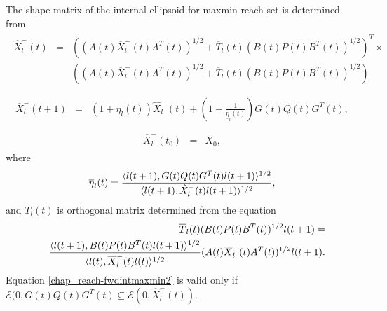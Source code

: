 \documentclass[letterpaper,10pt,english]{sphinxmanual}
\begin{document}
The shape matrix of the internal ellipsoid for maxmin reach set is
determined from
\label{chap_reach:equation-fwdintmaxmin1}\begin{gather}
\begin{split}\hat{X}^-_l(t) & = &
\left((A(t)\overline{X}^-_l(t)A^T(t))^{1/2} +
\overline{T}_l(t)(B(t)P(t)B^T(t))^{1/2}\right)^T
\times \nonumber \\
& &\left((A(t)\overline{X}^-_l(t)A^T(t))^{1/2} +
\overline{T}_l(t)(B(t)P(t)B^T(t))^{1/2}\right)\\\end{split}\label{chap_reach-fwdintmaxmin1}
\end{gather}\label{chap_reach:equation-fwdintmaxmin2}\begin{gather}
\begin{split}\overline{X}^-_l(t+1) & = &
(1+\overline{\eta}_l(t))\hat{X}^-_l(t) +
\left(1+\frac{1}{\underline{\eta}_l(t)}\right)
G(t)Q(t)G^T(t), \\\end{split}\label{chap_reach-fwdintmaxmin2}
\end{gather}\label{chap_reach:equation-fwdintmaxmin3}\begin{gather}
\begin{split}\overline{X}^-_l(t_0) & = & X_0,\end{split}\label{chap_reach-fwdintmaxmin3}
\end{gather}
where
\begin{gather}
\begin{split}\overline{\eta}_l(t) = \frac{\langle l(t+1),
G(t)Q(t)G^T(t)l(t+1)\rangle^{1/2}}{\langle l(t+1),
\hat{X}^-_l(t)l(t+1)\rangle^{1/2}},\end{split}\notag
\end{gather}
and $\overline{T}_l(t)$ is orthogonal matrix determined from the
equation
\begin{gather}
\begin{split}\begin{aligned}
& & \overline{T}_l(t)(B(t)P(t)B^T(t))^{1/2}l(t+1) = \\
& & \frac{\langle l(t+1),
B(t)P(t)B^T(t)l(t+1)\rangle^{1/2}}{\langle l(t),
\overline{X}^-_l(t)l(t)\rangle^{1/2}}(A(t)\overline{X}^-_l(t)A^T(t))^{1/2}l(t+1).\end{aligned}\end{split}\notag
\end{gather}
Equation \eqref{chap_reach-fwdintmaxmin2} is valid only if
${\mathcal E}(0,G(t)Q(t)G^T(t)\subseteq{\mathcal E}(0,\hat{X}^-_l(t))$.
\end{document}
